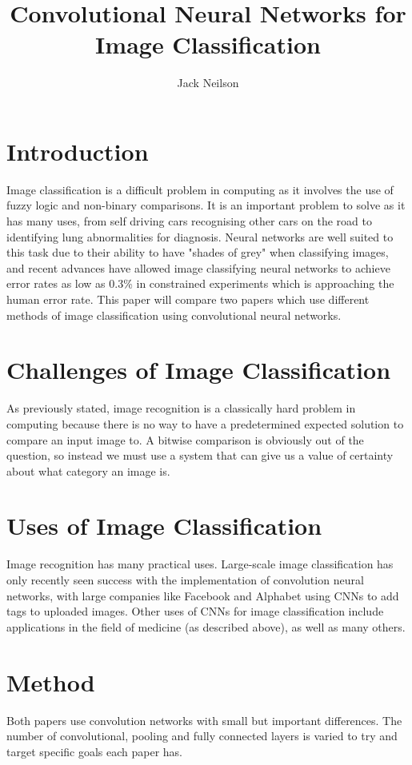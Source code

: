 \documentclass{article}
\begin{document}
\title{Convolutional Neural Networks for Image Classification}
\author{Jack Neilson}

\maketitle
\newpage
\section{Introduction}
Image classification is a difficult problem in computing as it involves the use of fuzzy logic and non-binary comparisons. It is an important problem to solve as it has many uses, from self driving cars recognising other cars on the road to identifying lung abnormalities for diagnosis\cite{medical}. Neural networks are well suited to this task due to their ability to have "shades of grey" when classifying images, and recent advances have allowed image classifying neural networks to achieve error rates as low as 0.3\% in constrained experiments which is approaching the human error rate\cite{imagenet}. This paper will compare two papers which use different methods of image classification using convolutional neural networks.

\section{Challenges of Image Classification}

As previously stated, image recognition is a classically hard problem in computing because there is no way to have a predetermined expected solution to compare an input image to. A bitwise comparison is obviously out of the question, so instead we must use a system that can give us a value of certainty about what category an image is.

\section{Uses of Image Classification}

Image recognition has many practical uses. Large-scale image classification has only recently seen success with the implementation of convolution neural networks, with large companies like Facebook and Alphabet using CNNs to add tags to uploaded images. Other uses of CNNs for image classification include applications in the field of medicine (as described above), as well as many others.

\section{Method}
Both papers use convolution networks with small but important differences. The number of convolutional, pooling and fully connected layers is varied to try and target specific goals each paper has.
\end{document}
